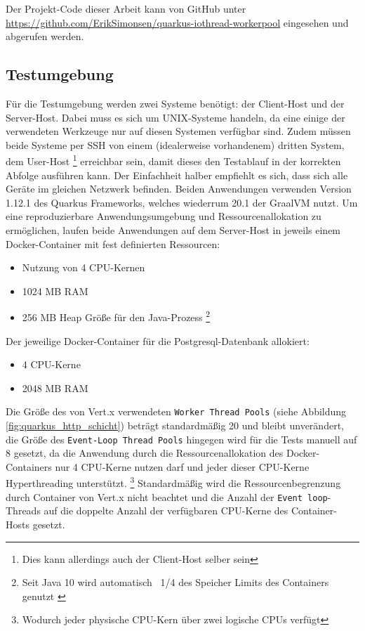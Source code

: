 Der Projekt-Code dieser Arbeit kann von GitHub unter \url{https://github.com/ErikSimonsen/quarkus-iothread-workerpool} eingesehen und abgerufen werden.

\subsection{Testumgebung}
\label{section:testumgebung}
Für die Testumgebung werden zwei Systeme benötigt: der Client-Host und der Server-Host.
Dabei muss es sich um UNIX-Systeme handeln, da eine einige der verwendeten Werkzeuge nur auf diesen Systemen verfügbar sind.
Zudem müssen beide Systeme per SSH von einem (idealerweise vorhandenem) dritten System, dem User-Host
\footnote{Dies kann allerdings auch der Client-Host selber sein}
erreichbar sein, damit dieses den Testablauf in der korrekten Abfolge ausführen kann.
Der Einfachheit halber empfiehlt es sich, dass sich alle Geräte im gleichen Netzwerk befinden.
Beiden Anwendungen verwenden Version 1.12.1 des Quarkus Frameworks, welches wiederrum 20.1 der GraalVM nutzt.
Um eine reproduzierbare Anwendungsumgebung und Ressourcenallokation zu ermöglichen, laufen beide Anwendungen auf dem Server-Host in
jeweils einem Docker-Container mit fest definierten Ressourcen:
\begin{itemize}
  \item Nutzung von 4 CPU-Kernen
  \item 1024 MB RAM
  \item 256 MB Heap Größe für den Java-Prozess
        \footnote{Seit Java 10 wird automatisch ~1/4 des Speicher Limits des Containers genutzt \parencite{Java10ReleaseNotes}}
\end{itemize}
Der jeweilige Docker-Container für die Postgresql-Datenbank allokiert:
\begin{itemize}
  \item 4 CPU-Kerne
  \item 2048 MB RAM
\end{itemize}

Die Größe des von Vert.x verwendeten \verb|Worker Thread Pools| (siehe Abbildung \ref{fig:quarkus_http_schicht}) beträgt standardmäßig 20 und bleibt
unverändert, die Größe des \verb|Event-Loop Thread Pools| hingegen wird für die Tests manuell auf 8 gesetzt, da die Anwendung durch die Ressourcenallokation
des Docker-Containers nur 4 CPU-Kerne nutzen darf und jeder dieser CPU-Kerne Hyperthreading unterstützt. \footnote{Wodurch jeder physische CPU-Kern über
  zwei logische CPUs verfügt}
Standardmäßig wird die Ressourcenbegrenzung durch Container von Vert.x nicht beachtet und die Anzahl der \verb|Event loop|-Threads auf die doppelte
Anzahl der verfügbaren CPU-Kerne des Container-Hosts gesetzt.

